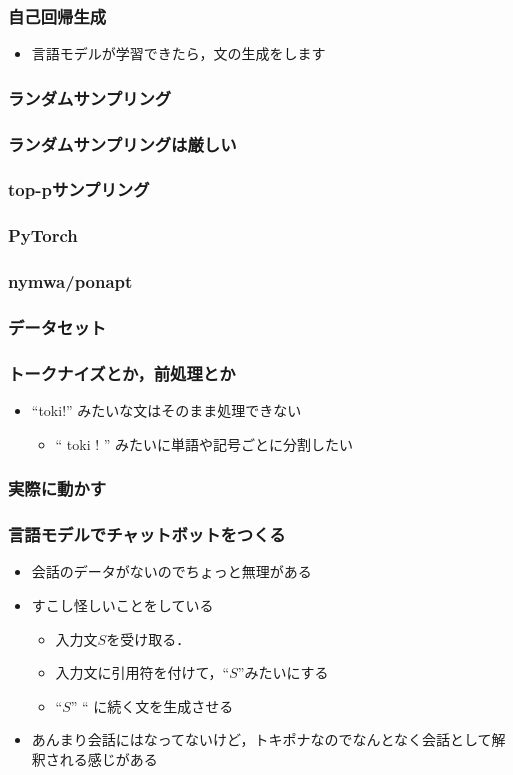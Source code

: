 \documentclass[14pt]{beamer}
\begin{document}
\begin{frame}
	\frametitle{自己回帰生成}

	\begin{itemize}
		\item 言語モデルが学習できたら，文の生成をします
	\end{itemize}
\end{frame}

\begin{frame}
	\frametitle{ランダムサンプリング}
\end{frame}

\begin{frame}
	\frametitle{ランダムサンプリングは厳しい}
\end{frame}

\begin{frame}
	\frametitle{top-pサンプリング}
\end{frame}

\begin{frame}
	\frametitle{PyTorch}
\end{frame}

\begin{frame}
	\frametitle{nymwa/ponapt}
\end{frame}

\begin{frame}
	\frametitle{データセット}

\end{frame}

\begin{frame}
	\frametitle{トークナイズとか，前処理とか}
	\begin{itemize}
		\item ``toki!'' みたいな文はそのまま処理できない
			\begin{itemize}
				\item `` toki ! '' みたいに単語や記号ごとに分割したい
			\end{itemize}
	\end{itemize}
\end{frame}

\begin{frame}
	\frametitle{実際に動かす}
\end{frame}

\begin{frame}
	\frametitle{言語モデルでチャットボットをつくる}

	\begin{itemize}
		\item 会話のデータがないのでちょっと無理がある
		\item すこし怪しいことをしている
			\begin{itemize}
				\item 入力文$S$を受け取る．
				\item 入力文に引用符を付けて，``$S$''みたいにする
				\item ``$S$'' `` に続く文を生成させる
			\end{itemize}
		\item あんまり会話にはなってないけど，トキポナなのでなんとなく会話として解釈される感じがある
	\end{itemize}
\end{frame}
\end{document}
